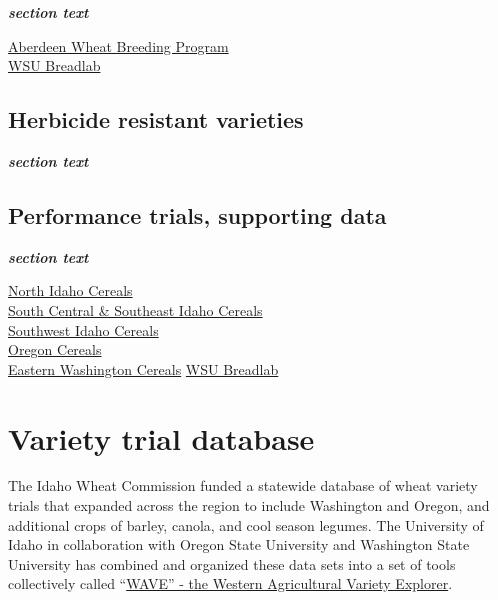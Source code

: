 \documentclass[
  letterpaper,
  DIV=11,
  numbers=noendperiod]{scrreprt}
\begin{document}
\textbf{\emph{section text}}

\href{https://www.uidaho.edu/cals/aberdeen-research-and-extension-center/wheat-breeding}{Aberdeen
Wheat Breeding Program}\\
\href{https://breadlab.wsu.edu/research/wsu-breadlab-varieties/}{WSU
Breadlab}

\section{Herbicide resistant
varieties}\label{herbicide-resistant-varieties}

\textbf{\emph{section text}}

\section{Performance trials, supporting
data}\label{performance-trials-supporting-data}

\textbf{\emph{section text}}

\href{https://www.uidaho.edu/extension/cereals/north/variety-trials}{North
Idaho Cereals}\\
\href{https://www.uidaho.edu/extension/cereals/scseidaho/sgr}{South
Central \& Southeast Idaho Cereals}\\
\href{https://www.uidaho.edu/extension/cereals/southwest/varieties}{Southwest
Idaho Cereals}\\
\href{https://cropandsoil.oregonstate.edu/wheat/variety-trials}{Oregon
Cereals}\\
\href{https://smallgrains.wsu.edu/variety/archives/}{Eastern Washington
Cereals} \href{https://breadlab.wsu.edu/research/test-results/}{WSU
Breadlab}


\chapter{Variety trial database}\label{variety-trial-database}

The Idaho Wheat Commission funded a statewide database of wheat variety
trials that expanded across the region to include Washington and Oregon,
and additional crops of barley, canola, and cool season legumes. The
University of Idaho in collaboration with Oregon State University and
Washington State University has combined and organized these data sets
into a set of tools collectively called ``\href{}{WAVE'' - the Western
Agricultural Variety Explorer}.
\end{document}
